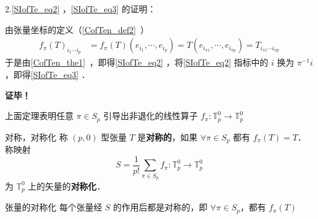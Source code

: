 2.\autoref{SIofTe_eq2} ，\autoref{SIofTe_eq3} 的证明：

由张量坐标的定义（\autoref{CofTen_def2}~）
\begin{equation}
\begin{aligned}
f_{\pi}(T)_{i_1\cdots i_p}&=f_{\pi}(T)(e_{i_1},\cdots,e_{i_p})=T(e_{i_{\pi1}},\cdots,e_{i_{\pi p}})=T_{i_{\pi1}\cdots i_{\pi p}}
\end{aligned}
\end{equation}
于是由\autoref{CofTen_the1}~，即得\autoref{SIofTe_eq2} ，将\autoref{SIofTe_eq2} 指标中的 $i$ 换为  $\pi^{-1} i$，即得\autoref{SIofTe_eq3} ．

\textbf{证毕！}

上面定理表明任意 $\pi \in S_p$ 引导出非退化的线性算子 $f_\pi:\mathbb{T}_p^0\rightarrow\mathbb{T}_p^0$ 
\begin{definition}{对称，对称化}
称 $(p,0)$ 型张量 $T$ 是\textbf{对称的}，如果 $\forall \pi\in S_p$ 都有 $f_{\pi}(T)=T$．称映射 
\begin{equation}
S=\frac{1}{p!}\sum_{\pi\in S_p} f_\pi:\mathbb{T}_p^0\rightarrow\mathbb{T}_p^0
\end{equation}
为 $\mathbb{T}_p^0$ 上的矢量的\textbf{对称化}．
\end{definition}

\begin{theorem}{张量的对称化}
每个张量经 $S$ 的作用后都是对称的，即 $\forall \pi\in S_p$，都有 $f_\pi(T)$
\end{theorem}